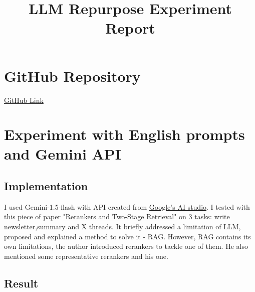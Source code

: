 \documentclass[12pt]{article}
\begin{document}
\title{LLM Repurpose Experiment Report}
\author{}
\date{}
\maketitle

\section*{GitHub Repository}
\href{https://github.com/Minhsuperfragile/llm_repurpose.git}{GitHub Link}

\section{Experiment with English prompts and Gemini API}

\subsection*{Implementation}

I used Gemini-1.5-flash with API created from \href{https://aistudio.google.com}{Google's AI studio}.\newline
I tested with this piece of paper \href{https://www.pinecone.io/learn/series/rag/rerankers/}{"Rerankers and Two-Stage Retrieval"} on 3 tasks: write newsletter,summary and X threads. 
It briefly addressed a limitation of LLM, proposed and explained a method to solve it - RAG. However, RAG contains its own limitations,
the author introduced rerankers to tackle one of them. He also mentioned some representative rerankers and his one.

\subsection*{Result}
\end{document}
